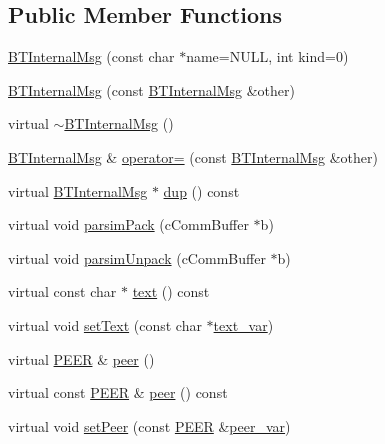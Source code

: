\subsection*{Public Member Functions}
\begin{DoxyCompactItemize}
\item 
\hyperlink{classBTInternalMsg_a53b2c681b85235a280f2457f9fd5635c}{B\+T\+Internal\+Msg} (const char $\ast$name=N\+U\+L\+L, int kind=0)
\item 
\hyperlink{classBTInternalMsg_a357a57a913f8e9bbde6e0ec3bf8b2916}{B\+T\+Internal\+Msg} (const \hyperlink{classBTInternalMsg}{B\+T\+Internal\+Msg} \&other)
\item 
virtual \hyperlink{classBTInternalMsg_afe98460fb9ac940a12be1575463db062}{$\sim$\+B\+T\+Internal\+Msg} ()
\item 
\hyperlink{classBTInternalMsg}{B\+T\+Internal\+Msg} \& \hyperlink{classBTInternalMsg_a51f11cbf48627a72aae6f10af630755c}{operator=} (const \hyperlink{classBTInternalMsg}{B\+T\+Internal\+Msg} \&other)
\item 
virtual \hyperlink{classBTInternalMsg}{B\+T\+Internal\+Msg} $\ast$ \hyperlink{classBTInternalMsg_ae50271eba13f59591144f7376b759f47}{dup} () const 
\item 
virtual void \hyperlink{classBTInternalMsg_ab3a268d92a96f2ebacca8a8ddc573c2b}{parsim\+Pack} (c\+Comm\+Buffer $\ast$b)
\item 
virtual void \hyperlink{classBTInternalMsg_ad036d69ceeb72e7745fed2dfe9a2e311}{parsim\+Unpack} (c\+Comm\+Buffer $\ast$b)
\item 
virtual const char $\ast$ \hyperlink{classBTInternalMsg_a2e545dd7e0abe0b1d03339ad4b43ed26}{text} () const 
\item 
virtual void \hyperlink{classBTInternalMsg_a29a8ee557b699a3c753f75112c3d1dde}{set\+Text} (const char $\ast$\hyperlink{classBTInternalMsg_a8c02d34494805be9a533ffd978c02420}{text\+\_\+var})
\item 
virtual \hyperlink{structPEER}{P\+E\+E\+R} \& \hyperlink{classBTInternalMsg_ac31be4b9cd9bd9a974fe4b65dfad8469}{peer} ()
\item 
virtual const \hyperlink{structPEER}{P\+E\+E\+R} \& \hyperlink{classBTInternalMsg_ab81f702ef1442807b835649b63e0112c}{peer} () const 
\item 
virtual void \hyperlink{classBTInternalMsg_a095bd7691fd267f76303106940e5e5d4}{set\+Peer} (const \hyperlink{structPEER}{P\+E\+E\+R} \&\hyperlink{classBTInternalMsg_aedc6acce926c31ae1d032110de29e871}{peer\+\_\+var})
\item 

\end{DoxyCompactItemize}
